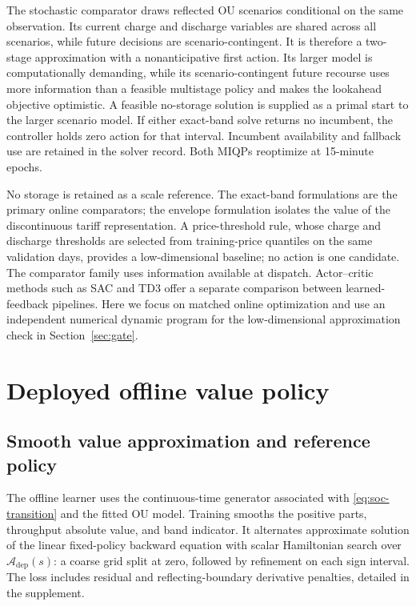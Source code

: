 \documentclass[preprint,11pt]{elsarticle}
\newcommand{\cA}{\mathcal{A}}
\theoremstyle{plain}
\theoremstyle{remark}
\begin{document}
The stochastic comparator draws reflected OU scenarios conditional on the same
observation. Its current charge and discharge variables are shared across all
scenarios, while future decisions are scenario-contingent. It is therefore a
two-stage approximation with a nonanticipative first action. Its larger model
is computationally demanding, while its scenario-contingent future recourse
uses more information than a feasible multistage policy and makes the lookahead
objective optimistic. A
feasible no-storage solution is supplied as a primal start to the larger
scenario model. If either exact-band solve returns no incumbent, the controller
holds zero action for that interval. Incumbent availability and fallback use
are retained in the solver record. Both MIQPs reoptimize at 15-minute epochs.

No storage is retained as a scale reference. The exact-band formulations are
the primary online comparators; the envelope formulation isolates the value of
the discontinuous tariff representation. A price-threshold rule, whose charge
and discharge thresholds are selected from training-price quantiles on the
same validation days, provides a low-dimensional baseline; no action is one
candidate. The comparator family uses information available at dispatch.
Actor--critic methods such as SAC and TD3 \citep{Haarnoja2018,Fujimoto2018}
offer a separate comparison between learned-feedback pipelines. Here we focus
on matched online optimization and use an independent numerical dynamic
program for the low-dimensional approximation check in Section~\ref{sec:gate}.

\section{Deployed offline value policy}\label{sec:method}

\subsection{Smooth value approximation and reference policy}

The offline learner uses the continuous-time generator associated with
\eqref{eq:soc-transition} and the fitted OU model. Training smooths the
positive parts, throughput absolute value, and band indicator. It alternates
approximate solution of the linear fixed-policy backward equation with scalar
Hamiltonian search over $\cA_{\mathrm{dep}}(s)$: a coarse grid split at zero,
followed by refinement on each sign interval. The loss includes residual and
reflecting-boundary derivative penalties, detailed in the supplement.
\end{document}
